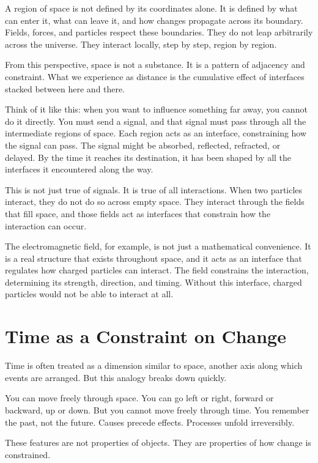 \documentclass[
  openright]{book}
\begin{document}
A region of space is not defined by its coordinates alone. It is defined
by what can enter it, what can leave it, and how changes propagate
across its boundary. Fields, forces, and particles respect these
boundaries. They do not leap arbitrarily across the universe. They
interact locally, step by step, region by region.

From this perspective, space is not a substance. It is a pattern of
adjacency and constraint. What we experience as distance is the
cumulative effect of interfaces stacked between here and there.

Think of it like this: when you want to influence something far away,
you cannot do it directly. You must send a signal, and that signal must
pass through all the intermediate regions of space. Each region acts as
an interface, constraining how the signal can pass. The signal might be
absorbed, reflected, refracted, or delayed. By the time it reaches its
destination, it has been shaped by all the interfaces it encountered
along the way.

This is not just true of signals. It is true of all interactions. When
two particles interact, they do not do so across empty space. They
interact through the fields that fill space, and those fields act as
interfaces that constrain how the interaction can occur.

The electromagnetic field, for example, is not just a mathematical
convenience. It is a real structure that exists throughout space, and it
acts as an interface that regulates how charged particles can interact.
The field constrains the interaction, determining its strength,
direction, and timing. Without this interface, charged particles would
not be able to interact at all.

\section{Time as a Constraint on
Change}\label{time-as-a-constraint-on-change}

Time is often treated as a dimension similar to space, another axis
along which events are arranged. But this analogy breaks down quickly.

You can move freely through space. You can go left or right, forward or
backward, up or down. But you cannot move freely through time. You
remember the past, not the future. Causes precede effects. Processes
unfold irreversibly.

These features are not properties of objects. They are properties of how
change is constrained.
\end{document}
